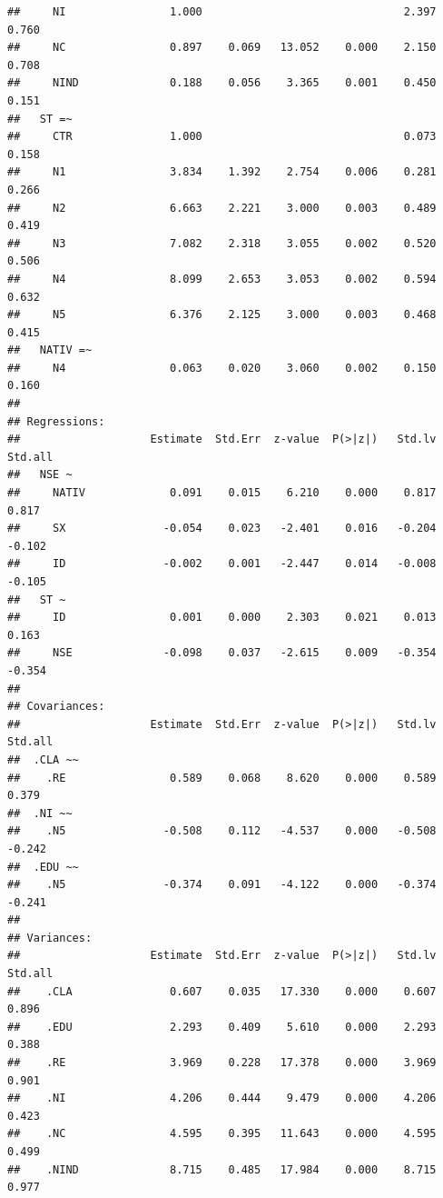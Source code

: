 \documentclass[
  12pt,
]{article}
\begin{document}
\begin{verbatim}
##     NI                1.000                               2.397    0.760
##     NC                0.897    0.069   13.052    0.000    2.150    0.708
##     NIND              0.188    0.056    3.365    0.001    0.450    0.151
##   ST =~                                                                 
##     CTR               1.000                               0.073    0.158
##     N1                3.834    1.392    2.754    0.006    0.281    0.266
##     N2                6.663    2.221    3.000    0.003    0.489    0.419
##     N3                7.082    2.318    3.055    0.002    0.520    0.506
##     N4                8.099    2.653    3.053    0.002    0.594    0.632
##     N5                6.376    2.125    3.000    0.003    0.468    0.415
##   NATIV =~                                                              
##     N4                0.063    0.020    3.060    0.002    0.150    0.160
## 
## Regressions:
##                    Estimate  Std.Err  z-value  P(>|z|)   Std.lv  Std.all
##   NSE ~                                                                 
##     NATIV             0.091    0.015    6.210    0.000    0.817    0.817
##     SX               -0.054    0.023   -2.401    0.016   -0.204   -0.102
##     ID               -0.002    0.001   -2.447    0.014   -0.008   -0.105
##   ST ~                                                                  
##     ID                0.001    0.000    2.303    0.021    0.013    0.163
##     NSE              -0.098    0.037   -2.615    0.009   -0.354   -0.354
## 
## Covariances:
##                    Estimate  Std.Err  z-value  P(>|z|)   Std.lv  Std.all
##  .CLA ~~                                                                
##    .RE                0.589    0.068    8.620    0.000    0.589    0.379
##  .NI ~~                                                                 
##    .N5               -0.508    0.112   -4.537    0.000   -0.508   -0.242
##  .EDU ~~                                                                
##    .N5               -0.374    0.091   -4.122    0.000   -0.374   -0.241
## 
## Variances:
##                    Estimate  Std.Err  z-value  P(>|z|)   Std.lv  Std.all
##    .CLA               0.607    0.035   17.330    0.000    0.607    0.896
##    .EDU               2.293    0.409    5.610    0.000    2.293    0.388
##    .RE                3.969    0.228   17.378    0.000    3.969    0.901
##    .NI                4.206    0.444    9.479    0.000    4.206    0.423
##    .NC                4.595    0.395   11.643    0.000    4.595    0.499
##    .NIND              8.715    0.485   17.984    0.000    8.715    0.977

\end{verbatim}
\end{document}
